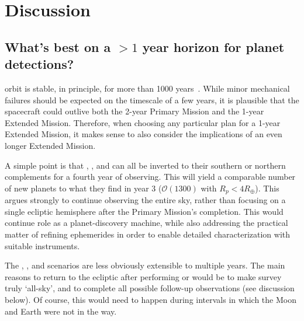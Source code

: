 \section{Discussion} 
\label{sec:discussion}

\subsection{What's best on a $>1$ year horizon for planet detections?}
\label{sec:gtr_1yr_horizon}

\tesss orbit is stable, in principle, for more than 1000 years~\citep{gangestad_high_2013}.
While minor mechanical failures should be expected on the timescale of a few years, it is plausible that the spacecraft could outlive both the 2-year Primary Mission and the 1-year Extended Mission.
Therefore, when choosing any particular plan for a 1-year Extended Mission, it makes
sense to also consider the implications of an even longer Extended Mission.

A simple point is that \nhemi, \npole, and \shemiAvoid\:can all be inverted to their southern or northern complements for a fourth year of observing.
This will yield a comparable number of new planets to what they find in year 3 ($\mathcal{O}(1300)$ with $R_p<4R_\oplus$).
This argues strongly to continue observing the entire sky, rather than focusing on a single ecliptic hemisphere after the Primary Mission's completion.
This would continue \tesss role as a planet-discovery machine, while also addressing the practical matter of refining ephemerides in order to enable detailed characterization with suitable instruments.

The \elong, \eshort, and \hemis\:scenarios are less obviously extensible to multiple years.
The main reasons to return to the ecliptic after performing \elong\:or \eshort\:would be to make \tesss survey truly `all-sky', and to complete all possible \ktwo follow-up observations (see discussion below).
Of course, this would need to happen during intervals in which the Moon and Earth were not in the way.

